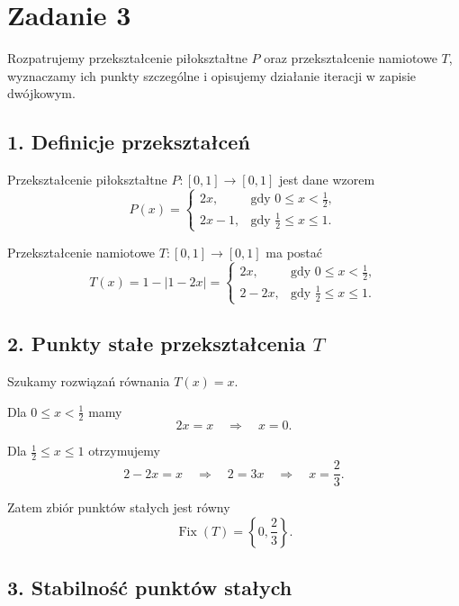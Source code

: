 \documentclass[11pt,a4paper]{article}
\newcommand{\abs}[1]{\left\lvert #1 \right\rvert}
\newcommand{\set}[1]{\left\{ #1 \right\}}
\newcommand{\Fix}{\operatorname{Fix}}
\theoremstyle{plain}
\theoremstyle{definition}
\begin{document}
\section{Zadanie 3}

\begin{opisbox}
Rozpatrujemy przekszta\l cenie pi\l okszta\l tne \(P\) oraz przekszta\l cenie namiotowe \(T\), wyznaczamy
ich punkty szczeg\'olne i opisujemy dzia\l anie iteracji w zapisie dw\'ojkowym.
\end{opisbox}

\begin{rozwiazaniebox}
\subsection*{1. Definicje przekszta\l ce\'n}

Przekszta\l cenie pi\l okszta\l tne \(P \colon [0,1] \to [0,1]\) jest dane wzorem
\[
P(x)=
\begin{cases}
2x, & \text{gdy } 0 \le x < \tfrac{1}{2},\\[0.3em]
2x-1, & \text{gdy } \tfrac{1}{2} \le x \le 1.
\end{cases}
\]

Przekszta\l cenie namiotowe \(T \colon [0,1] \to [0,1]\) ma posta\'c
\[
T(x)=1-\abs{1-2x}=
\begin{cases}
2x, & \text{gdy } 0 \le x < \tfrac{1}{2},\\[0.3em]
2-2x, & \text{gdy } \tfrac{1}{2} \le x \le 1.
\end{cases}
\]

\subsection*{2. Punkty sta\l e przekszta\l cenia \(T\)}

Szukamy rozwi\k{a}za\'n r\'ownania \(T(x)=x\).

Dla \(0 \le x < \tfrac{1}{2}\) mamy
\[
    2x=x \quad \Longrightarrow \quad x=0.
\]

Dla \(\tfrac{1}{2} \le x \le 1\) otrzymujemy
\[
    2-2x=x \quad \Longrightarrow \quad 2=3x \quad \Longrightarrow \quad x=\frac{2}{3}.
\]

Zatem zbi\'or punkt\'ow sta\l ych jest r\'owny
\[
    \Fix(T)=\set{0,\frac{2}{3}}.
\]

\subsection*{3. Stabilno\'s\'c punkt\'ow sta\l ych}


\end{rozwiazaniebox}
\end{document}
